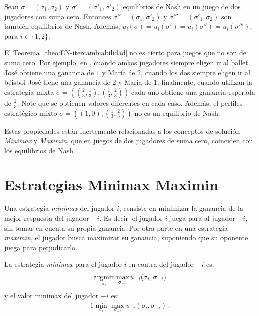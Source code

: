 \begin{theorem}
\label{theo:EN-itercambiabilidad}
Sean $\sigma = (\sigma_1, \sigma_2)$ y $\sigma' = (\sigma'_1, \sigma'_2)$ equilibrios de Nash en un juego de dos jugadores con suma cero. Entonces $\sigma'' = (\sigma_1, \sigma'_2)$ y $\sigma''' = (\sigma'_1, \sigma_2)$ son también equilibrios de Nash. Además, $u_i(\sigma) = u_i(\sigma') = u_i(\sigma'') = u_i(\sigma''')$, para $i \in \{1, 2\}$.
\end{theorem}

El Teorema~\ref{theo:EN-itercambiabilidad} no es cierto para juegos que no son de suma cero. Por ejemplo, en , cuando ambos jugadores siempre eligen ir al ballet José obtiene una ganancia de $1$ y María de $2$, cuando los dos siempre eligen ir al béisbol José tiene una ganancia de $2$ y María de $1$, finalmente, cuando utilizan la estrategia mixta $\sigma = \left(\left(\frac{2}{3}, \frac{1}{3}\right), \left(\frac{1}{3}, \frac{2}{3}\right)\right)$ cada uno obtiene una ganancia esperada de $\frac{2}{3}$. Note que se obtienen valores diferentes en cada caso. Además, el perfiles estratégico mixto $\sigma = \left((1, 0), \left(\frac{1}{3}, \frac{2}{3}\right)\right)$ no es un equilibrio de Nash.

Estas propiedades están fuertemente relacionadas a los conceptos de solución \textit{Minimax} y \textit{Maximin}, que en juegos de dos jugadores de suma cero, coinciden con los equilibrios de Nash.

\section{Estrategias Minimax Maximin}

Una estrategia \textit{minimax} del jugador $i$, consiste en minimizar la ganancia de la mejor respuesta del jugador $-i$. Es decir, el jugador $i$ juega para  al jugador $-i$, sin tomar en cuenta su propia ganancia. Por otra parte en una estrategia \textit{maximin}, el jugador busca maximizar su ganancia, suponiendo que su oponente juega para perjudicarlo.

\begin{definition}
La estrategia \textit{minimax} para el jugador $i$ en contra del jugador $-i$ es:
\begin{alignat}{1}
\operatorname*{\arg\!\min}_{\sigma_i}{\max_{\sigma_{-i}}{u_{-i}(\sigma_i, \sigma_{-i})}}
\end{alignat}
y el valor minimax del jugador $-i$ es:
\begin{alignat}{1}
\min_{\sigma_i}{\max_{\sigma_{-i}}{u_{-i}(\sigma_i, \sigma_{-i})}} \,.
\end{alignat}
\end{definition}


